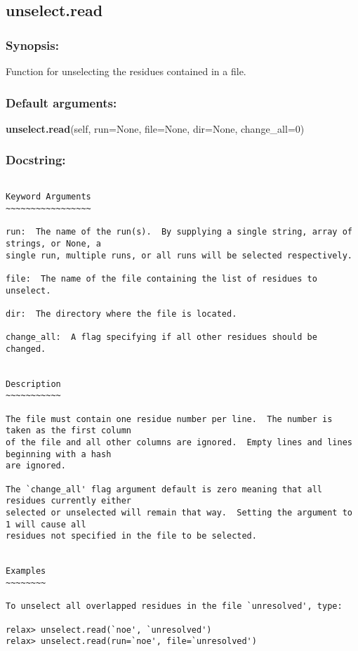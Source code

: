 \newpage

\subsection{unselect.read}


\subsubsection{Synopsis:}

Function for unselecting the residues contained in a file.

\subsubsection{Default arguments:}

\textsf{\textbf{unselect.read}(self, run=None, file=None, dir=None, change\_all=0)
}


\subsubsection{Docstring:}

{\scriptsize
\begin{verbatim}

Keyword Arguments
~~~~~~~~~~~~~~~~~

run:  The name of the run(s).  By supplying a single string, array of strings, or None, a
single run, multiple runs, or all runs will be selected respectively.

file:  The name of the file containing the list of residues to unselect.

dir:  The directory where the file is located.

change_all:  A flag specifying if all other residues should be changed.


Description
~~~~~~~~~~~

The file must contain one residue number per line.  The number is taken as the first column
of the file and all other columns are ignored.  Empty lines and lines beginning with a hash
are ignored.

The `change_all' flag argument default is zero meaning that all residues currently either
selected or unselected will remain that way.  Setting the argument to 1 will cause all
residues not specified in the file to be selected.


Examples
~~~~~~~~

To unselect all overlapped residues in the file `unresolved', type:

relax> unselect.read(`noe', `unresolved')
relax> unselect.read(run=`noe', file=`unresolved')
\end{verbatim}
}




